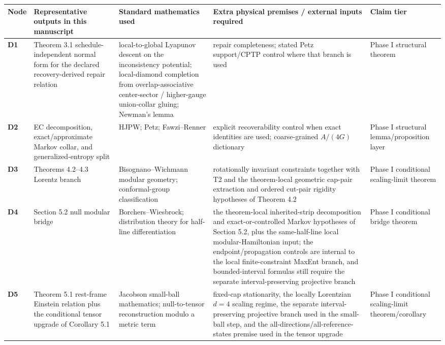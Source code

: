 \begingroup
\scriptsize
{\def\LTcaptype{none}
\setlength{\tabcolsep}{2pt}
\begin{longtable}[]{@{}>{\RaggedRight\arraybackslash}p{}>{\RaggedRight\arraybackslash}p{}>{\RaggedRight\arraybackslash}p{}>{\RaggedRight\arraybackslash}p{}>{\RaggedRight\arraybackslash}p{}@{}}
\toprule\noalign{}
Node & Representative outputs in this manuscript & Standard mathematics used & Extra physical premises / external inputs required & Claim tier \\
\midrule\noalign{}
\endhead
\bottomrule\noalign{}
\endlastfoot
\textbf{D1} & Theorem 3.1 schedule-independent normal form for the declared recovery-derived repair relation & local-to-global Lyapunov descent on the inconsistency potential; local-diamond completion from overlap-associative center-sector / higher-gauge union-collar gluing; Newman's lemma & repair completeness; stated Petz support/CPTP control where that branch is used & Phase I structural theorem \\
\textbf{D2} & EC decomposition, exact/approximate Markov collar, and generalized-entropy split & HJPW; Petz; Fawzi--Renner & explicit recoverability control when exact identities are used; coarse-grained \(A/(4G)\) dictionary & Phase I structural lemma/proposition layer \\
\textbf{D3} & Theorems 4.2--4.3 Lorentz branch & Bisognano--Wichmann modular geometry; conformal-group classification & rotationally invariant constraints together with T2 and the theorem-local geometric cap-pair extraction and ordered cut-pair rigidity hypotheses of Theorem 4.2 & Phase I conditional scaling-limit theorem \\
\textbf{D4} & Section 5.2 null modular bridge & Borchers--Wiesbrock; distribution theory for half-line differentiation & the theorem-local inherited-strip decomposition and exact-or-controlled Markov hypotheses of Section 5.2, plus the same-half-line local modular-Hamiltonian input; the endpoint/propagation controls are internal to the local finite-constraint MaxEnt branch, and bounded-interval formulas still require the separate interval-preserving projective branch & Phase I conditional bridge theorem \\
\textbf{D5} & Theorem 5.1 rest-frame Einstein relation plus the conditional tensor upgrade of Corollary 5.1 & Jacobson small-ball mathematics; null-to-tensor reconstruction modulo a metric term & fixed-cap stationarity, the locally Lorentzian \(d=4\) scaling regime, the separate interval-preserving projective branch used in the small-ball step, and the all-directions/all-reference-states premise used in the tensor upgrade & Phase I conditional scaling-limit theorem/corollary \\

\end{longtable}}
